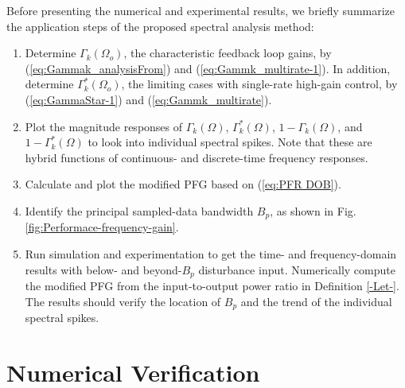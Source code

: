 \documentclass [11pt, proquest] {uwthesis}[2020/02/24]
\begin{document}
Before presenting the numerical and experimental results, we briefly
summarize the application steps of the proposed spectral analysis
method:
\begin{enumerate}
\item Determine $\Gamma_{k}(\Omega_{o})$, the characteristic feedback loop
gains, by (\ref{eq:Gammak_analysisFrom}) and (\ref{eq:Gammk_multirate-1}).
In addition, determine $\Gamma_{k}^{*}(\Omega_{o})$, the limiting
cases with single-rate high-gain control, by (\ref{eq:GammaStar-1})
and (\ref{eq:Gammk_multirate}).
\item Plot the magnitude responses of $\Gamma_{k}(\Omega)$, $\Gamma_{k}^{*}(\Omega)$,
$1-\Gamma_{k}(\Omega)$, and $1-\Gamma_{k}^{*}(\Omega)$ to look into
individual spectral spikes. Note that these are hybrid functions of
continuous- and discrete-time frequency responses.
\item Calculate and plot the modified PFG based on (\ref{eq:PFR DOB}).
\item Identify the principal sampled-data bandwidth $B_{p}$, as shown in
Fig. \ref{fig:Performace-frequency-gain}.
\item Run simulation and experimentation to get the time- and frequency-domain
results with below- and beyond-$B_{p}$ disturbance input. Numerically
compute the modified PFG from the input-to-output power ratio in Definition
\ref{-Let-}. The results should verify the location of $B_{p}$ and
the trend of the individual spectral spikes.
\end{enumerate}

\section{Numerical Verification\label{sec:Numerical-Verification}}
\end{document}
